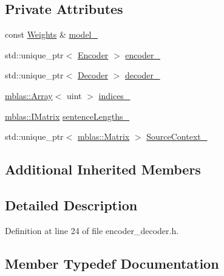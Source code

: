 \subsection*{Private Attributes}
\begin{DoxyCompactItemize}
\item 
const \hyperlink{structamunmt_1_1GPU_1_1Weights}{Weights} \& \hyperlink{classamunmt_1_1GPU_1_1EncoderDecoder_add8e2bd2813773ed4a065bcd3f61ed53}{model\+\_\+}
\item 
std\+::unique\+\_\+ptr$<$ \hyperlink{classamunmt_1_1GPU_1_1Encoder}{Encoder} $>$ \hyperlink{classamunmt_1_1GPU_1_1EncoderDecoder_a82f39e1636ccb055a0fefef34714240d}{encoder\+\_\+}
\item 
std\+::unique\+\_\+ptr$<$ \hyperlink{classamunmt_1_1GPU_1_1Decoder}{Decoder} $>$ \hyperlink{classamunmt_1_1GPU_1_1EncoderDecoder_aa4b1f9d9dd63fa77d117d2925ec835ab}{decoder\+\_\+}
\item 
\hyperlink{classamunmt_1_1GPU_1_1mblas_1_1Array}{mblas\+::\+Array}$<$ uint $>$ \hyperlink{classamunmt_1_1GPU_1_1EncoderDecoder_ac073876fdd7353241f52941d7b7d0351}{indices\+\_\+}
\item 
\hyperlink{namespaceamunmt_1_1GPU_1_1mblas_ad6a337d269d1833a6028b8871e57d2d0}{mblas\+::\+I\+Matrix} \hyperlink{classamunmt_1_1GPU_1_1EncoderDecoder_aa136ecd71d9211ee3fc9c04c22930e02}{sentence\+Lengths\+\_\+}
\item 
std\+::unique\+\_\+ptr$<$ \hyperlink{namespaceamunmt_1_1GPU_1_1mblas_ab67821a8254de53e45a623cf73c0aef6}{mblas\+::\+Matrix} $>$ \hyperlink{classamunmt_1_1GPU_1_1EncoderDecoder_a14a3d24c5ddf7916a3c1e853eae929ff}{Source\+Context\+\_\+}
\end{DoxyCompactItemize}
\subsection*{Additional Inherited Members}


\subsection{Detailed Description}


Definition at line 24 of file encoder\+\_\+decoder.\+h.



\subsection{Member Typedef Documentation}
